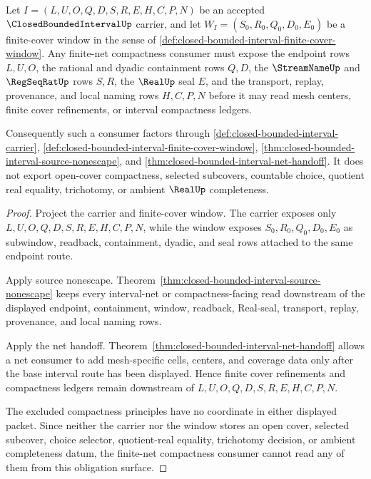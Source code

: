 \begin{theorem}
\label{thm:closed-bounded-interval-finite-net-compactness-obligations}
Let $I=(L,U,O,Q,D,S,R,E,H,C,P,N)$ be an accepted $\ClosedBoundedIntervalUp$ carrier, and let $W_I=(S_0,R_0,Q_0,D_0,E_0)$ be a finite-cover window in the sense of \autoref{def:closed-bounded-interval-finite-cover-window}. Any finite-net compactness consumer must expose the endpoint rows $L,U,O$, the rational and dyadic containment rows $Q,D$, the $\StreamNameUp$ and $\RegSeqRatUp$ rows $S,R$, the $\RealUp$ seal $E$, and the transport, replay, provenance, and local naming rows $H,C,P,N$ before it may read mesh centers, finite cover refinements, or interval compactness ledgers.

Consequently such a consumer factors through \autoref{def:closed-bounded-interval-carrier}, \autoref{def:closed-bounded-interval-finite-cover-window}, \autoref{thm:closed-bounded-interval-source-nonescape}, and \autoref{thm:closed-bounded-interval-net-handoff}. It does not export open-cover compactness, selected subcovers, countable choice, quotient real equality, trichotomy, or ambient $\RealUp$ completeness.
\end{theorem}
\begin{proof}
Project the carrier and finite-cover window. The carrier exposes only $L,U,O,Q,D,S,R,E,H,C,P,N$, while the window exposes $S_0,R_0,Q_0,D_0,E_0$ as subwindow, readback, containment, dyadic, and seal rows attached to the same endpoint route.

Apply source nonescape. Theorem~\ref{thm:closed-bounded-interval-source-nonescape} keeps every interval-net or compactness-facing read downstream of the displayed endpoint, containment, window, readback, Real-seal, transport, replay, provenance, and local naming rows.

Apply the net handoff. Theorem~\ref{thm:closed-bounded-interval-net-handoff} allows a net consumer to add mesh-specific cells, centers, and coverage data only after the base interval route has been displayed. Hence finite cover refinements and compactness ledgers remain downstream of $L,U,O,Q,D,S,R,E,H,C,P,N$.

The excluded compactness principles have no coordinate in either displayed packet. Since neither the carrier nor the window stores an open cover, selected subcover, choice selector, quotient-real equality, trichotomy decision, or ambient completeness datum, the finite-net compactness consumer cannot read any of them from this obligation surface.
\end{proof}


